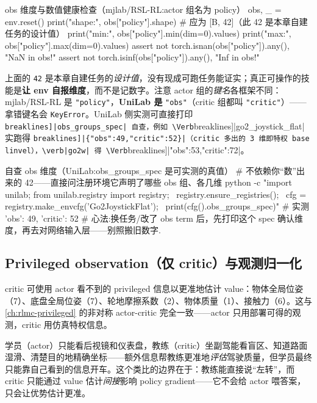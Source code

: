 \begin{codebox}[Python]{obs 维度与数值健康检查（mjlab/RSL-RL:actor 组名为 policy）}
obs, _ = env.reset()
print("shape:", obs["policy"].shape)               # 应为 [B, 42]（此 42 是本章自建任务的设计值）
print("min:", obs["policy"].min(dim=0).values)
print("max:", obs["policy"].max(dim=0).values)
assert not torch.isnan(obs["policy"]).any(), "NaN in obs!"
assert not torch.isinf(obs["policy"]).any(), "Inf in obs!"
\end{codebox}

\begin{note}[别背“42 维”——让框架\emph{告诉}你维度（组名 mjlab=\texttt{policy} vs UniLab=\texttt{obs}）]
上面的 \verb|42| 是本章自建任务的\emph{设计值}，没有现成可跑任务能证实；真正可操作的技能是\textbf{让 env 自报维度}，而不是记数字。注意 actor 组的\emph{键名}各框架不同：mjlab/RSL-RL 是 \verb|"policy"|，\textbf{UniLab 是} \verb|"obs"|（critic 组都叫 \verb|"critic"|）——拿错键名会 \verb|KeyError|。UniLab 侧实测可直接打印 \Verb[breaklines]|obs_groups_spec| 自查，例如 \Verb[breaklines]|go2_joystick_flat| 实跑得 \Verb[breaklines]|{"obs":49,"critic":52}|（critic 多出的 3 维即特权 base linvel），\verb|go2w| 得 \Verb[breaklines]|{"obs":53,"critic":72}|。

\begin{codebox}[bash]{自查 obs 维度（UniLab:obs\_groups\_spec 是可实测的真值）}
# 不依赖你“数”出来的 42——直接问注册环境它声明了哪些 obs 组、各几维
python -c "import unilab; from unilab.registry import registry; \
registry.ensure_registries(); \
cfg = registry.make_envcfg('Go2JoystickFlat'); \
print(cfg().obs_groups_spec)"        # 实测 {'obs': 49, 'critic': 52}
# 心法:换任务/改了 obs term 后，先打印这个 spec 确认维度，再去对网络输入层——别照搬旧数字.
\end{codebox}
\end{note}

\subsection{Privileged observation（仅 critic）与观测归一化}
\label{sec:rlmc-wh-privileged}

critic 可使用 actor 看不到的 privileged 信息以更准地估计 value：物体全局位姿（7）、底盘全局位姿（7）、轮地摩擦系数（2）、物体质量（1）、接触力（6）。这与 \cref{ch:rlmc-privileged} 的非对称 actor-critic 完全一致——actor 只用部署可得的观测，critic 用仿真特权信息。

\begin{insight}\label{ins:rlmc-wh-asym}
学员（actor）只能看后视镜和仪表盘，教练（critic）坐副驾能看盲区、知道路面湿滑、清楚目的地精确坐标——额外信息帮教练更准地\emph{评估}驾驶质量，但学员最终只能靠自己看到的信息开车。这个类比的边界在于：教练能直接说“左转”，而 critic 只能通过 value 估计\emph{间接}影响 policy gradient——它不会给 actor 喂答案，只会让优势估计更准。
\end{insight}


